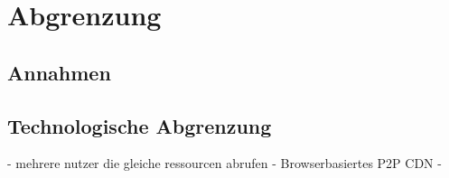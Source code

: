 \chapter{Abgrenzung}\label{ch:demarcation}

\section{Annahmen}

\section{Technologische Abgrenzung}

- mehrere nutzer die gleiche ressourcen abrufen
- Browserbasiertes P2P CDN
- 
